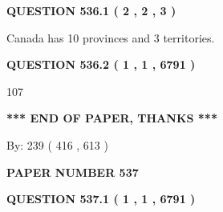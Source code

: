\documentclass[12pt]{article}
\begin{document}
\vspace{0.2in}
  
{\textbf{\Large{QUESTION
536.1 
 ( 2 , 2 , 3 )
}}}
  
  
 
 
\noindent{}
 
 
Canada has 10  provinces and 3 territories.
 
 
 
 
  
\vspace{0.2in}
  
{\textbf{\Large{QUESTION
536.2 
 ( 1 , 1 , 6791 )
}}}
  
  
 
 
\noindent{}

107
 
 
   
   
 \vspace{0.2in}
 
   
   
   
   
\vspace{1.0in} 
{\textbf{\large{ *** END OF PAPER, THANKS *** }}} 
   
   
\hspace{1.0in} By: 
 239 ( 416 ,  613 )
   
   
   
   
\newpage 
\setcounter{page}{ 
   537001 } 
   
   
   
   
 {\textbf{ \Large{ PAPER NUMBER  537  }}}
   
   
\vspace{0.2in}
   
   
   
   
   
   
 \vspace{0.2in}
 
 
 
 
   
   
  
\vspace{0.2in}
  
{\textbf{\Large{QUESTION
537.1 
 ( 1 , 1 , 6791 )
}}}
  
  
 
\end{document}

